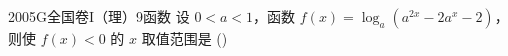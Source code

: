 
\begin{problem}{2005}{G}{全国卷I（理）}{9}{函数}
设 $ 0<a<1 $，函数 $ f(x)=\log_a(a^{2x}-2a^x-2) $，则使 $ f(x)<0 $ 的 $ x $ 取值范围是 (\hspace{1cm})
\begin{choices}
\end{choices}
\end{problem}

\begin{answer}

\end{answer}

\begin{solutions}

\end{solutions}